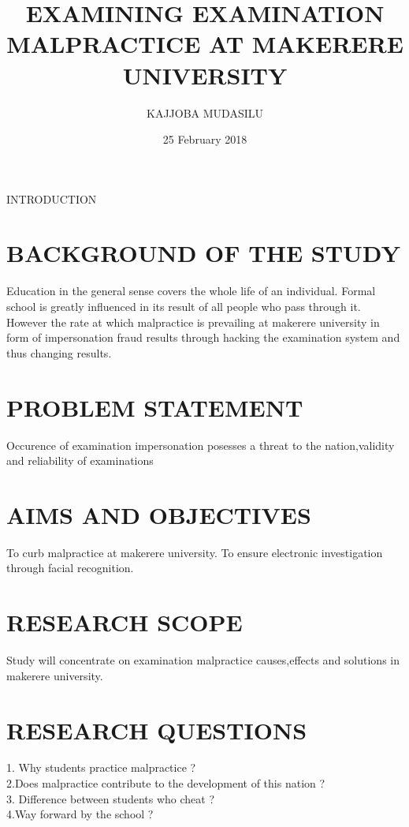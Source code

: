 \documentclass{article}
\title{EXAMINING EXAMINATION MALPRACTICE AT MAKERERE UNIVERSITY}
\author{KAJJOBA MUDASILU }
\date{25 February 2018}
\begin{document}
\maketitle  INTRODUCTION

\section{BACKGROUND OF THE STUDY}
Education in the general sense covers the whole life of an individual.
Formal school is greatly influenced in its result of all people who pass through it.
However the rate at which malpractice is prevailing at makerere university in form of impersonation 
fraud results through hacking the examination system and thus changing results.

\section{ PROBLEM STATEMENT}
Occurence of examination impersonation posesses a threat to the nation,validity and reliability of
examinations
\section{ AIMS AND OBJECTIVES} 
To curb malpractice at makerere university.
To ensure electronic investigation through facial recognition.
\section{ RESEARCH SCOPE}
Study will concentrate on examination malpractice causes,effects and solutions in makerere university.
\section{ RESEARCH QUESTIONS}
1. Why students practice malpractice ?\\
2.Does malpractice contribute to the development of this nation ?\\
3. Difference between students who cheat ?\\
4.Way forward by the school ?\\
\end{document}
